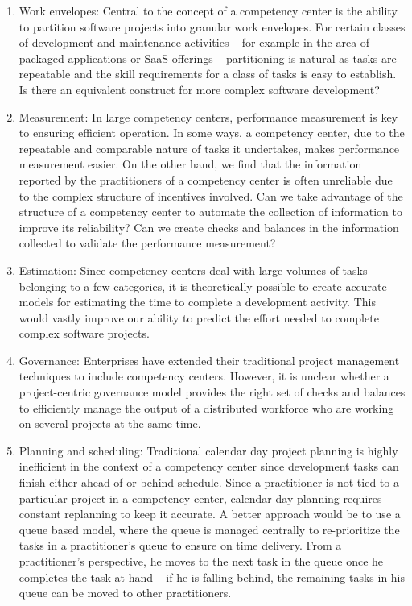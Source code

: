 \begin{enumerate}
\item Work envelopes: Central to the concept of a competency center is the ability to partition software projects into granular work envelopes. For certain classes of development and maintenance activities -- for example in the area of packaged applications or SaaS offerings -- partitioning is natural as tasks are repeatable and the skill requirements for a class of tasks is easy to establish. Is there an equivalent construct for more complex software development? 
\item Measurement: In large competency centers, performance measurement is key to ensuring efficient operation. In some ways, a competency center, due to the repeatable and comparable nature of tasks it undertakes, makes performance measurement easier. On the other hand, we find that the information reported by the practitioners of a competency center is often unreliable due to the complex structure of incentives involved. Can we take advantage of the structure of a competency center to automate the collection of information to improve its reliability? Can we create checks and balances in the information collected to validate the performance measurement?
\item Estimation: Since competency centers deal with large volumes of tasks belonging to a few categories, it is theoretically possible to create accurate models for estimating the time to complete a development activity. This would vastly improve our ability to predict the effort needed to complete complex software projects.
\item Governance: Enterprises have extended their traditional project management techniques to include competency centers. However, it is unclear whether a project-centric governance model provides the right set of checks and balances to efficiently manage the output of a distributed workforce who are working on several projects at the same time.  
\item Planning and scheduling: Traditional calendar day project planning is highly inefficient in the context of a competency center since development tasks can finish either ahead of or behind schedule. Since a practitioner is not tied to a particular project in a competency center, calendar day planning requires constant replanning to keep it accurate. A better approach would be to use a queue based model, where the queue is managed centrally to re-prioritize the tasks in a practitioner's queue to ensure on time delivery. From a practitioner's perspective, he moves to the next task in the queue once he completes the task at hand -- if he is falling behind, the remaining tasks in his queue can be moved to other practitioners.
\end{enumerate}

